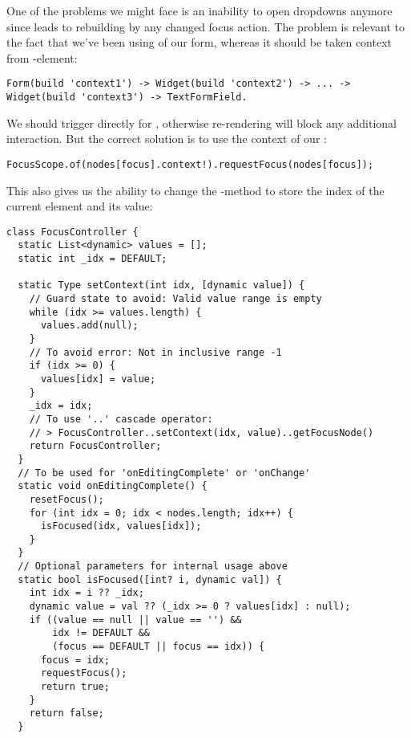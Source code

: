 \noindent One of the problems we might face is an inability to open dropdowns anymore since 
 leads to rebuilding by any changed focus action. The problem is relevant to the 
fact that we've been using  of our form, whereas it should be taken context from -element:

\begin{lstlisting}
Form(build 'context1') -> Widget(build 'context2') -> ... -> Widget(build 'context3') -> TextFormField.
\end{lstlisting}

\noindent We should trigger  directly for , otherwise re-rendering 
will block any additional interaction. But the correct solution is to use the context of our :

\begin{lstlisting}
FocusScope.of(nodes[focus].context!).requestFocus(nodes[focus]);
\end{lstlisting}

\noindent This also gives us the ability to change the -method to store the index of the current element 
and its value:

\begin{lstlisting}
class FocusController {
  static List<dynamic> values = [];
  static int _idx = DEFAULT;

  static Type setContext(int idx, [dynamic value]) {
    // Guard state to avoid: Valid value range is empty
    while (idx >= values.length) {
      values.add(null);
    }
    // To avoid error: Not in inclusive range -1
    if (idx >= 0) {
      values[idx] = value;
    }
    _idx = idx;
    // To use '..' cascade operator:
    // > FocusController..setContext(idx, value)..getFocusNode()
    return FocusController; 
  }
  // To be used for 'onEditingComplete' or 'onChange'
  static void onEditingComplete() {
    resetFocus();
    for (int idx = 0; idx < nodes.length; idx++) {
      isFocused(idx, values[idx]);
    }
  }
  // Optional parameters for internal usage above
  static bool isFocused([int? i, dynamic val]) {
    int idx = i ?? _idx;
    dynamic value = val ?? (_idx >= 0 ? values[idx] : null);
    if ((value == null || value == '') &&
        idx != DEFAULT &&
        (focus == DEFAULT || focus == idx)) {
      focus = idx;
      requestFocus();
      return true;
    }
    return false;
  }
\end{lstlisting}

